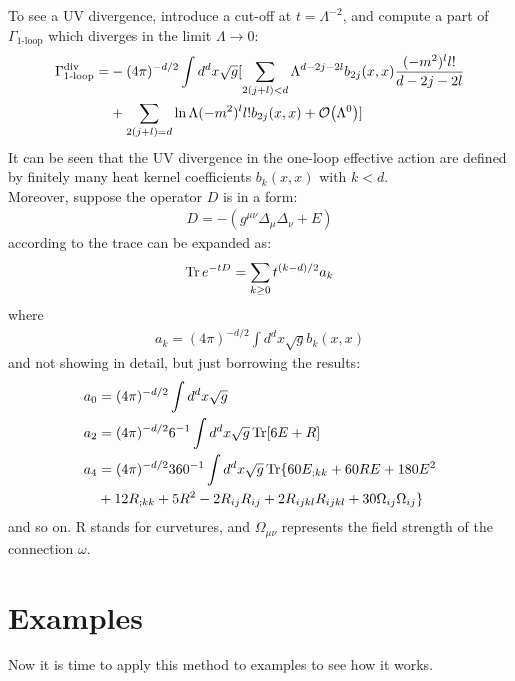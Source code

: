 To see a UV divergence, introduce a cut-off at $t=\Lambda ^{-2}$, and compute a part of $\Gamma _{\text{1-loop}}$ which diverges in the limit $\Lambda \to 0$:
\begin{align}
    \begin{split}
    \Gamma _{\text{1-loop}} ^{\text{div}} =&  -(4\pi)^{-d/2} \int d^{d} x \sqrt{g} [ \sum_{2(j+l)< d} \Lambda ^{d-2j-2l} b_{2j}(x,x) \frac{(-m^{2})^{l} l!} {d-2j-2l}  \\
    &+ \sum_{2(j+l) =d} \ln \Lambda (-m^{2})^{l} l! b_{2j} (x,x) + \order {\Lambda ^{0}} ] 
    \end{split}
\end{align}
It can be seen that the UV divergence in the one-loop effective action are defined by finitely many heat kernel coefficients $b_{k} (x,x)$ with $k<d$. \\
\indent Moreover, suppose the operator $D$ is in a form:
\begin{align}
    D = -(g^{\mu \nu} \Delta _{\mu} \Delta _{\nu} + E)
\end{align}
according to %
the trace can be expanded as:
\begin{align}
    \Tr e^{-tD} = \sum _{k \ge 0} t^{(k-d)/2} a_{k}
\end{align}
where
\begin{align}
    a_k = (4\pi)^{-d/2} \int d^{d}x \sqrt{g} b_{k}(x,x)
\end{align}
and not showing in detail, but just borrowing the results:
\begin{align}
    a_{0} &= (4\pi)^{-d/2} \int d^{d} x \sqrt{g} \\
    a_{2} &= (4\pi)^{-d/2} 6^{-1} \int d^{d} x \sqrt{g} \Tr [6E + R] \\
    a_{4} &= (4\pi)^{-d/2} 360 ^{-1} \int d^{d}x \sqrt{g} \Tr \lbrace 60E_{;kk} + 60RE + 180 E^2 \nonumber  \\
    & + 12 R_{;kk} + 5R^{2} -2R_{ij}R_{ij} + 2R_{ijkl}R_{ijkl} + 30 \Omega _{ij} \Omega _{ij}\rbrace
\end{align}
and so on. R stands for curvetures, and $\Omega _{\mu \nu}$ represents the field strength of the connection $\omega$. 

\section{Examples}
Now it is time to apply this method to examples to see how it works. 
